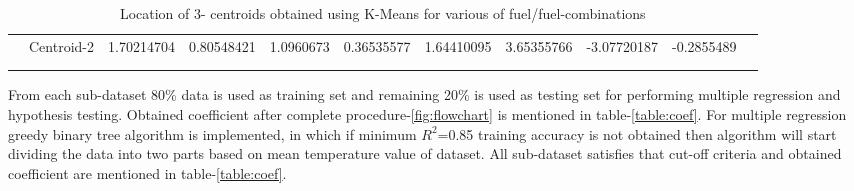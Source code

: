 \documentclass[preprint,12pt]{elsarticle}
\begin{document}
\begin{table}[H]
\begin{tabular}{ccccccccccc}
				  			\multicolumn{1}{|c|}{} & \multicolumn{1}{c|}{Centroid-2} & \multicolumn{1}{c|}{1.70214704} & \multicolumn{1}{c|}{0.80548421} & \multicolumn{1}{c|}{1.0960673} & \multicolumn{1}{c|}{0.36535577} & \multicolumn{1}{c|}{1.64410095} & \multicolumn{1}{c|}{3.65355766} & \multicolumn{1}{c|}{-3.07720187} & \multicolumn{1}{c|}{-0.2855489} &  \\ \cline{1-10}
				  			&  &  &  &  &  &  &  &  &  &  \\
				  			&  &  &  &  &  &  &  &  &  & 
				  		\end{tabular}
				  	\caption{Location of 3- centroids obtained using K-Means for various of fuel/fuel-combinations }
				  	\label{table:centroid}
				  \end{table}
				   
				  From each sub-dataset 80\% data is used as training set and remaining 20\% is used as testing set for performing multiple regression and hypothesis testing. Obtained coefficient after complete procedure-\ref{fig:flowchart} is mentioned in table-\ref{table:coef}. For multiple regression greedy binary tree algorithm is implemented, in which if minimum $R^2$=0.85 training accuracy is not obtained then algorithm will start dividing the data into two parts based on mean temperature value of dataset. All sub-dataset satisfies that cut-off criteria and obtained coefficient are  mentioned in table-\ref{table:coef}.
\end{document}
